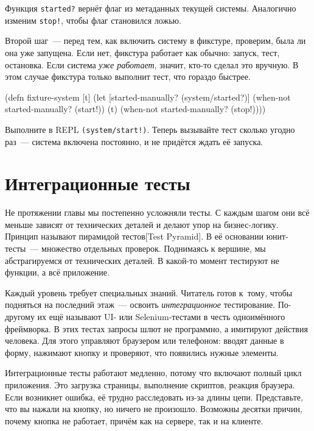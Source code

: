 Функция \verb|started?| вернёт флаг из метаданных текущей системы. Аналогично
изменим \verb|stop!|, чтобы флаг становился ложью.

Второй шаг~--- перед тем, как включить систему в фикстуре, проверим, была ли она
уже запущена. Если нет, фикстура работает как обычно: запуск, тест,
остановка. Если система \emph{уже работает}, значит, кто-то сделал это
вручную. В этом случае фикстура только выполнит тест, что гораздо быстрее.

\begin{english}
  \begin{clojure}
(defn fixture-system [t]
  (let [started-manually? (system/started?)]
    (when-not started-manually?
      (start!))
    (t)
    (when-not started-manually?
      (stop!))))
  \end{clojure}
\end{english}

Выполните в REPL \verb|(system/start!)|. Теперь вызывайте тест сколько угодно
раз~--- система включена постоянно, и не придётся ждать её запуска.

\section{Интеграционные тесты}


Не протяжении главы мы постепенно усложняли тесты. С каждым шагом они всё
меньше зависят от технических деталей и делают упор на бизнес-логику. Принцип
называют пирамидой тестов[Test Pyramid].
В её основании юнит-тесты~--- множество отдельных проверок. Поднимаясь к вершине,
мы абстрагируемся от технических деталей. В какой-то момент тестируют не функции,
а всё приложение.


Каждый уровень требует специальных знаний. Читатель готов к~тому, чтобы
подняться на последний этаж~--- освоить \emph{интеграционное}
тестирование. По-другому их ещё называют UI- или Selenium-тестами в честь
одноимённого фреймворка. В этих тестах запросы шлют не программно, а имитируют
действия человека. Для этого управляют браузером или телефоном: вводят данные в
форму, нажимают кнопку и проверяют, что появились нужные элементы.

Интеграционные тесты работают медленно, потому что включают полный цикл
приложения. Это загрузка страницы, выполнение скриптов, реакция браузера. Если
возникнет ошибка, её трудно расследовать из-за длины цепи. Представьте, что вы
нажали на кнопку, но ничего не произошло. Возможны десятки причин, почему кнопка
не работает, причём как на сервере, так и на клиенте.

